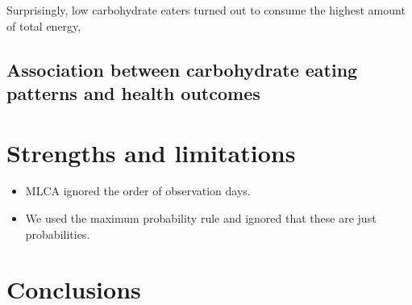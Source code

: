 Surprisingly, low carbohydrate eaters turned out to consume the highest amount of total energy, 




\subsection{Association between carbohydrate eating patterns and health outcomes}












\section{Strengths and limitations}



\begin{itemize}
	\item MLCA ignored the order of observation days.
	\item We used the maximum probability rule and ignored that these are just probabilities.
\end{itemize}



\section{Conclusions}